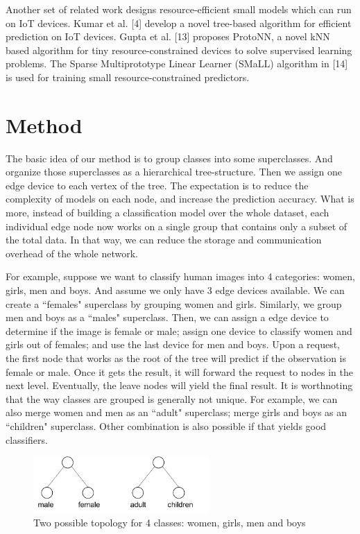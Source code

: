 \documentclass{article}
\begin{document}
Another set of related work designs resource-efficient small models which can run on IoT devices.  Kumar et al. [4] develop a novel tree-based algorithm for efficient prediction on IoT devices. Gupta et al. [13] proposes ProtoNN, a novel kNN based algorithm for tiny resource-constrained devices to solve supervised learning problems. The Sparse Multiprototype Linear Learner (SMaLL) algorithm in [14] is used for training small resource-constrained predictors.

\section{Method}
The basic idea of our method is to group classes into some superclasses. And organize those superclasses as a hierarchical tree-structure. Then we assign one edge device to each vertex of the tree. The expectation is to reduce the complexity of models on each node, and increase the prediction accuracy.  What is more, instead of building a classification model over the whole dataset, each individual edge node now works on a single group that contains only a subset of the total data. In that way, we can reduce the storage and communication overhead of the whole network.

For example, suppose we want to classify human images into 4 categories: women, girls, men and boys. And assume we only have 3 edge devices available. We can create a ``females" superclass by grouping women and girls. Similarly, we group men and boys as a ``males" superclass. Then, we can assign a edge device to determine if the image is female or male; assign one device to classify women and girls out of females; and use the last device for men and boys. Upon a request, the first node that works as the root of the tree will predict if the observation is female or male. Once it gets the result, it will forward the request to nodes in the next level. Eventually, the leave nodes will yield the final result. It is worthnoting that the way classes are grouped is generally not unique. For example, we can also merge women and men as an ``adult" superclass; merge girls and boys as an ``children" superclass. Other combination is also possible if that yields good classifiers.

\begin{figure}[ht]
  \centering
  \includegraphics[width=0.6\textwidth]{4_class.png}
  \caption{Two possible topology for 4 classes: women, girls, men and boys}
\end{figure}
\end{document}
